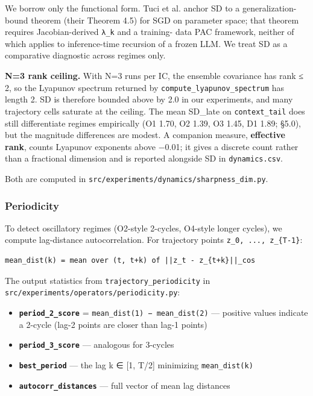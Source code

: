 \documentclass{article}
\theoremstyle{plain}
\theoremstyle{definition}
\begin{document}
We borrow only the functional form. Tuci et al. anchor SD to a
generalization-bound theorem (their Theorem 4.5) for SGD on parameter
space; that theorem requires Jacobian-derived \texttt{λ\_k} and a training-
data PAC framework, neither of which applies to inference-time
recursion of a frozen LLM. We treat SD as a comparative diagnostic
across regimes only.

\textbf{N=3 rank ceiling.} With N=3 runs per IC, the ensemble covariance
has rank ≤ 2, so the Lyapunov spectrum returned by
\texttt{compute\_lyapunov\_spectrum} has length 2. SD is therefore bounded
above by 2.0 in our experiments, and many trajectory cells saturate
at the ceiling. The mean SD\_late on \texttt{context\_tail} does still
differentiate regimes empirically (O1 1.70, O2 1.39, O3 1.45,
D1 1.89; §5.0), but the magnitude differences are modest. A
companion measure, \textbf{effective rank}, counts Lyapunov exponents
above −0.01; it gives a discrete count rather than a fractional
dimension and is reported alongside SD in \texttt{dynamics.csv}.

Both are computed in \texttt{src/experiments/dynamics/sharpness\_dim.py}.

\subsubsection{Periodicity}

To detect oscillatory regimes (O2-style 2-cycles, O4-style longer
cycles), we compute lag-distance autocorrelation. For trajectory points
\texttt{z\_0, ..., z\_\{T-1\}}:

\begin{verbatim}
mean_dist(k) = mean over (t, t+k) of ||z_t - z_{t+k}||_cos
\end{verbatim}

The output statistics from \texttt{trajectory\_periodicity} in
\texttt{src/experiments/operators/periodicity.py}:

\begin{itemize}
  \item \textbf{\texttt{period\_2\_score}} = \texttt{mean\_dist(1) − mean\_dist(2)} — positive
  values indicate a 2-cycle (lag-2 points are closer than lag-1 points)
  \item \textbf{\texttt{period\_3\_score}} — analogous for 3-cycles
  \item \textbf{\texttt{best\_period}} — the lag k ∈ [1, T/2] minimizing \texttt{mean\_dist(k)}
  \item \textbf{\texttt{autocorr\_distances}} — full vector of mean lag distances
\end{itemize}
\end{document}
